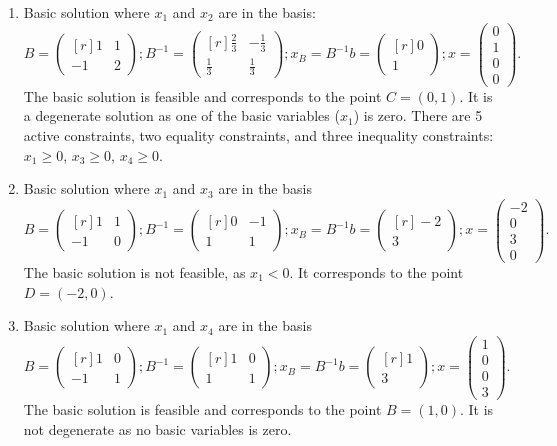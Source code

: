 \begin{enumerate}
\item Basic solution where $x_1$ and $x_2$ are in the basis:
$$
B =
\begin{pmatrix*}[r]
1&1\\
-1&2
\end{pmatrix*}
;
B^{-1} =
\begin{pmatrix*}[r]
\frac{2}{3}&-\frac{1}{3}\\
\frac{1}{3} & \frac{1}{3}
\end{pmatrix*}
;
x_B=B^{-1}b=
\begin{pmatrix*}[r]
0\\
1
\end{pmatrix*}
;
x
=
\begin{pmatrix}
0\\
1\\
0\\
0
\end{pmatrix}.
$$
The basic solution is feasible and corresponds to the point $C=(0,1)$. It
is a degenerate solution as one of the basic variables ($x_1$) is zero. There
are 5 active constraints, two equality constraints, and three
inequality constraints: $x_1 \geq 0$, $x_3 \geq 0$, $x_4 \geq 0$.

\item Basic solution where $x_1$ and $x_3$ are in the basis
$$
B =
\begin{pmatrix*}[r]
1&1\\
-1&0
\end{pmatrix*}
;
B^{-1} =
\begin{pmatrix*}[r]
0&-1\\
1 & 1
\end{pmatrix*}
;
x_B=B^{-1}b=
\begin{pmatrix*}[r]
-2\\
3
\end{pmatrix*}
;
x
=
\begin{pmatrix}
-2\\
0\\
3\\
0
\end{pmatrix}.
$$
The basic solution is not feasible, as $x_1 < 0$. It corresponds to the point $D=(-2,0)$.


\item Basic solution where $x_1$ and $x_4$ are in the basis
$$
B =
\begin{pmatrix*}[r]
1&0\\
-1&1
\end{pmatrix*}
;
B^{-1} =
\begin{pmatrix*}[r]
1&0\\
1 & 1
\end{pmatrix*}
;
x_B=B^{-1}b=
\begin{pmatrix*}[r]
1\\
3
\end{pmatrix*}
;
x
=
\begin{pmatrix}
1\\
0\\
0\\
3
\end{pmatrix}.
$$
The basic solution is feasible and corresponds to the point
$B=(1,0)$. It is not degenerate as no basic variables is zero.


\end{enumerate}
